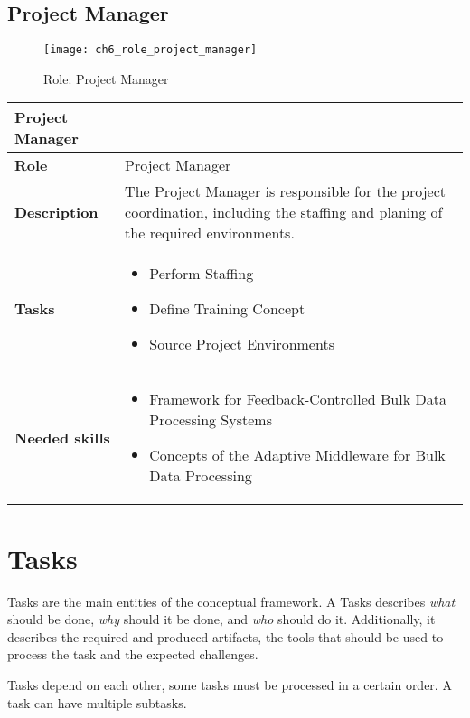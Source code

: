 \newpage

\subsection{Project Manager}

\begin{figure}[htpb] \centering 
	\texttt{[image: ch6\_role\_project\_manager]} 
	\caption{Role: Project Manager} 
	\label{fig:ch6_role_project_manager} 
\end{figure}

\begin{tabularx}{\textwidth}{@{} l X @{}}
	\caption{table}{Project Manager} \label{table:ch6_Role_Project_Manager}\\
	\toprule
	\bfseries Role & Project Manager\\
	\midrule
	\bfseries Description & The Project Manager is responsible for the project coordination, including the staffing and planing of the required environments.\\
	\midrule
	\bfseries Tasks & 
	\begin{itemize}
		\item Perform Staffing
		\item Define Training Concept
		\item Source Project Environments
	\end{itemize}
	\\
	\midrule 
	\bfseries Needed skills &
	\begin{itemize}
		\item Framework for Feedback-Controlled Bulk Data Processing Systems
		\item Concepts of the Adaptive Middleware for Bulk Data Processing
	\end{itemize}
	\\
	\bottomrule
\end{tabularx}


\section{Tasks}
\label{sec:ch6_tasks}

Tasks are the main entities of the conceptual framework. A Tasks describes \emph{what} should be done, \emph{why} should it be done, and \emph{who} should do it.
Additionally, it describes the required and produced artifacts, the tools that should be used to process the task and the expected challenges.

Tasks depend on each other, some tasks must be processed in a certain order. A task can have multiple subtasks.

